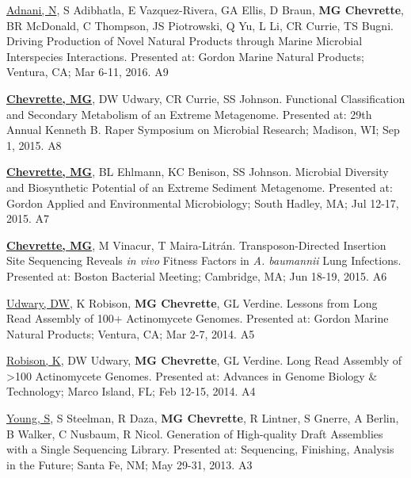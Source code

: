 \begin{cvpubs}
  \cvpub
    {\underline{Adnani, N}, S Adibhatla, E Vazquez-Rivera, GA Ellis, D Braun, \textbf{MG Chevrette}, BR McDonald, C Thompson, JS Piotrowski, Q Yu, L Li, CR Currie, TS Bugni.  Driving Production of Novel Natural Products through Marine Microbial Interspecies Interactions.  Presented at: Gordon Marine Natural Products; Ventura, CA; Mar 6-11, 2016.} %
    {A9} %
    
  \cvpub
    {\textbf{\underline{Chevrette, MG}}, DW Udwary, CR Currie, SS Johnson.  Functional Classification and Secondary Metabolism of an Extreme Metagenome.  Presented at: 29th Annual Kenneth B. Raper Symposium on Microbial Research; Madison, WI; Sep 1, 2015.} %
    {A8} %
    
  \cvpub
    {\textbf{\underline{Chevrette, MG}}, BL Ehlmann, KC Benison, SS Johnson.  Microbial Diversity and Biosynthetic Potential of an Extreme Sediment Metagenome.  Presented at: Gordon Applied and Environmental Microbiology; South Hadley, MA; Jul 12-17, 2015.} %
    {A7} %
    
  \cvpub
    {\textbf{\underline{Chevrette, MG}}, M Vinacur, T Maira-Litr\'{a}n.  Transposon-Directed Insertion Site Sequencing Reveals \textit{in vivo} Fitness Factors in \textit{A. baumannii} Lung Infections.  Presented at: Boston Bacterial Meeting; Cambridge, MA; Jun 18-19, 2015.} %
    {A6} %
    
  \cvpub
    {\underline{Udwary, DW}, K Robison, \textbf{MG Chevrette}, GL Verdine.  Lessons from Long Read Assembly of 100+ Actinomycete Genomes.  Presented at: Gordon Marine Natural Products; Ventura, CA; Mar 2-7, 2014.} %
    {A5} %
    
  \cvpub
    {\underline{Robison, K}, DW Udwary, \textbf{MG Chevrette}, GL Verdine.  Long Read Assembly of >100 Actinomycete Genomes.  Presented at: Advances in Genome Biology \& Technology; Marco Island, FL; Feb 12-15, 2014.} %
    {A4} %

  \cvpub
    {\underline{Young, S}, S Steelman, R Daza, \textbf{MG Chevrette}, R Lintner, S Gnerre, A Berlin, B Walker, C Nusbaum, R Nicol.  Generation of High-quality Draft Assemblies with a Single Sequencing Library.  Presented at: Sequencing, Finishing, Analysis in the Future; Santa Fe, NM; May 29-31, 2013.} %
    {A3} %
    

\end{cvpubs}
